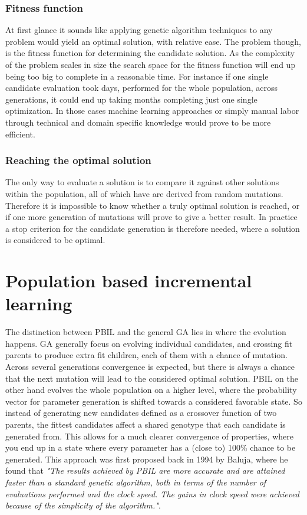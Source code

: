 \documentclass[a4paper,english]{report}
\begin{document}
					\subsubsection{Fitness function}
					At first glance it sounds like applying genetic algorithm techniques to any problem would yield an optimal solution, with relative ease. The problem though, is the fitness function for determining the candidate solution. As the complexity of the problem scales in size the search space for the fitness function will end up being too big to complete in a reasonable time. For instance if one single candidate evaluation took days, performed for the whole population, across generations, it could end up taking months completing just one single optimization. In those cases machine learning approaches or simply manual labor through technical and domain specific knowledge would prove to be more efficient.
					\subsubsection{Reaching the optimal solution}
					The only way to evaluate a solution is to compare it against other solutions within the population, all of which have are derived from random mutations. Therefore it is impossible to know whether a truly optimal solution is reached, or if one more generation of mutations will prove to give a better result. In practice a stop criterion for the candidate generation is therefore needed, where a solution is considered to be optimal.
			\section{Population based incremental learning}
			The distinction between PBIL and the general GA lies in where the evolution happens. GA generally focus on evolving individual candidates, and crossing fit parents to produce extra fit children, each of them with a chance of mutation. Across several generations convergence is expected, but there is always a chance that the next mutation will lead to the considered optimal solution. PBIL on the other hand evolves the whole population on a higher level, where the probability vector for parameter generation is shifted towards a considered favorable state. So instead of generating new candidates defined as a crossover function of two parents, the fittest candidates affect a shared genotype that each candidate is generated from. This allows for a much clearer convergence of properties, where you end up in a state where every parameter has a (close to) 100\% chance to be generated. This approach was first proposed back in 1994 by Baluja, where he found that \textit{"The results achieved by PBIL are more accurate and are	attained faster than a standard genetic algorithm, both in terms of the number of evaluations performed and the clock speed. The gains in clock speed were achieved because of the simplicity of the algorithm."}\cite{pbil}.
\end{document}
